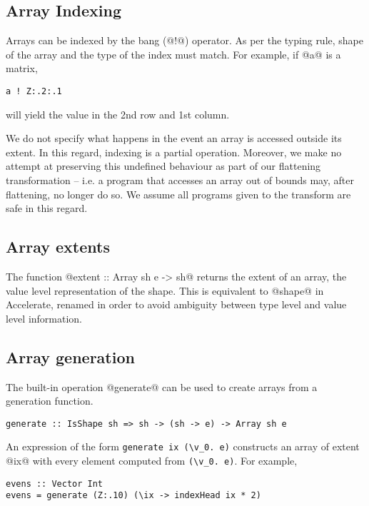 
\subsection{Array Indexing}

Arrays can be indexed by the bang (@!@) operator. As per the typing rule, shape of the array and the type of the index must match. For example, if @a@ is a matrix,
%
\begin{lstlisting}
a ! Z:.2:.1
\end{lstlisting}
%
will yield the value in the 2nd row and 1st column.

We do not specify what happens in the event an array is accessed outside its extent. In this regard, indexing is a partial operation. Moreover, we make no attempt at preserving this undefined behaviour as part of our flattening transformation -- i.e. a program that accesses an array out of bounds may, after flattening, no longer do so. We assume all programs given to the transform are safe in this regard.

\subsection{Array extents}
The function @extent :: Array sh e -> sh@ returns the extent of an array, the value level representation of the shape. This is equivalent to @shape@ in Accelerate, renamed in order to avoid ambiguity between type level and value level information.

\subsection{Array generation}
The built-in operation @generate@ can be used to create arrays from a generation function.
%
\begin{lstlisting}
generate :: IsShape sh => sh -> (sh -> e) -> Array sh e
\end{lstlisting}
%
An expression of the form \lstinline[style=ndp]{generate ix (\v_0. e)} constructs an array of extent @ix@ with every element computed from \lstinline[style=ndp]{(\v_0. e)}. For example,
%
\begin{lstlisting}
evens :: Vector Int
evens = generate (Z:.10) (\ix -> indexHead ix * 2)
\end{lstlisting}

